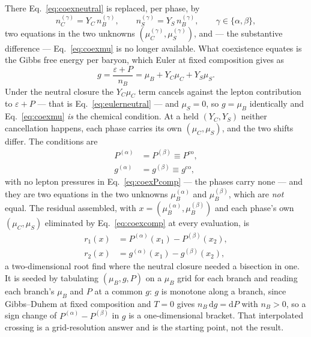 \documentclass[aps,prc,onecolumn,superscriptaddress,nofootinbib,10pt]{revtex4-2}
\newcommand{\nB}{n_B}
\newcommand{\nC}{n_C}
\newcommand{\nS}{n_S}
\newcommand{\muB}{\mu_B}
\newcommand{\muC}{\mu_C}
\newcommand{\muS}{\mu_S}
\begin{document}
There Eq.~\eqref{eq:coexneutral} is replaced, per phase, by
\begin{equation}
  \nC^{(\gamma)} = Y_C\, \nB^{(\gamma)}, \qquad
  \nS^{(\gamma)} = Y_S\, \nB^{(\gamma)}, \qquad
  \gamma \in \{\alpha, \beta\},
  \label{eq:coexcomp}
\end{equation}
two equations in the two unknowns $(\muC^{(\gamma)}, \muS^{(\gamma)})$, and ---
the substantive difference --- Eq.~\eqref{eq:coexmu} is no longer available.
What coexistence equates is the Gibbs free energy per baryon, which Euler at
fixed composition gives as
\begin{equation}
  g = \frac{\varepsilon + P}{\nB} = \muB + Y_C \muC + Y_S \muS .
  \label{eq:gibbs}
\end{equation}
Under the neutral closure the $Y_C \muC$ term cancels against the lepton
contribution to $\varepsilon + P$ --- that is Eq.~\eqref{eq:eulerneutral} ---
and $\muS = 0$, so $g = \muB$ identically and Eq.~\eqref{eq:coexmu} \emph{is}
the chemical condition. At a held $(Y_C, Y_S)$ neither cancellation happens,
each phase carries its own $(\muC, \muS)$, and the two shifts differ. The
conditions are
\begin{align}
  P^{(\alpha)} &= P^{(\beta)} \equiv P^{\text{co}},
  \label{eq:coexPcomp} \\
  g^{(\alpha)} &= g^{(\beta)} \equiv g^{\text{co}},
  \label{eq:coexgcomp}
\end{align}
with no lepton pressures in Eq.~\eqref{eq:coexPcomp} --- the phases carry none
--- and they are two equations in the two unknowns $\muB^{(\alpha)}$ and
$\muB^{(\beta)}$, which are \emph{not} equal. The residual assembled, with
$x = (\muB^{(\alpha)}, \muB^{(\beta)})$ and each phase's own $(\muC, \muS)$
eliminated by Eq.~\eqref{eq:coexcomp} at every evaluation, is
\begin{align}
  r_1(x) &= P^{(\alpha)}(x_1) - P^{(\beta)}(x_2), \nonumber \\
  r_2(x) &= g^{(\alpha)}(x_1) - g^{(\beta)}(x_2),
  \label{eq:coexrescomp}
\end{align}
a two-dimensional root find where the neutral closure needed a bisection in
one. It is seeded by tabulating $(\muB, g, P)$ on a $\muB$ grid for each branch
and reading each branch's $\muB$ and $P$ at a common $g$: $g$ is monotone along
a branch, since Gibbs--Duhem at fixed composition and $T = 0$ gives
$\nB\, \mathrm{d} g = \mathrm{d} P$ with $\nB > 0$, so a sign change of
$P^{(\alpha)} - P^{(\beta)}$ in $g$ is a one-dimensional bracket. That
interpolated crossing is a grid-resolution answer and is the starting point,
not the result.
\end{document}
